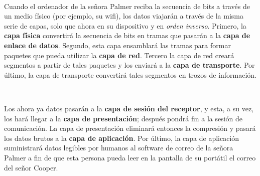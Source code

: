 \documentclass[a4paper,10pt]{article}
\begin{document}
\

Cuando el ordenador de la señora Palmer reciba la secuencia de bits a través de un medio físico (por ejemplo, su wifi), 
los datos viajarán a través de la misma serie de capas, solo que ahora en su dispositivo y en \textit{orden inverso}. 
Primero, la \textbf{capa física} convertirá la secuencia de bits en tramas que pasarán a la \textbf{capa de enlace de datos}. 
Segundo, esta capa ensamblará las tramas para formar paquetes que pueda utilizar la \textbf{capa de red}. 
Tercero la capa de red creará segmentos a partir de tales paquetes y los enviará a la \textbf{capa de transporte}. 
Por último, la capa de transporte convertirá tales segmentos en trozos de información.

\

Los ahora ya datos pasarán a la \textbf{capa de sesión del receptor}, y esta, a su vez, los hará llegar a la \textbf{capa de presentación}; 
después pondrá fin a la sesión de comunicación. La capa de presentación eliminará entonces la compresión y pasará los datos brutos a la \textbf{capa de aplicación}. 
Por último, la capa de aplicación suministrará datos legibles por humanos al software de correo de la señora Palmer a fin de que esta persona pueda leer en la pantalla de su portátil el correo del señor Cooper.
\end{document}
